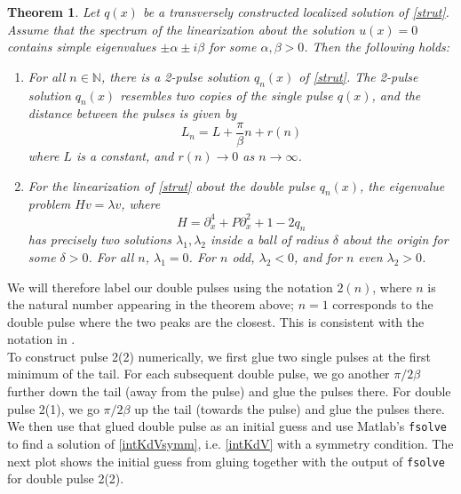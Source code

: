 \documentclass[12pt]{article}
\def\N{{\mathbb N}}
\newtheorem{theorem}{Theorem}
\begin{document}
\begin{theorem}
Let $q(x)$ be a transversely constructed localized solution of \eqref{strut}. Assume that the spectrum of the linearization about the solution $u(x) = 0$ contains simple eigenvalues $\pm \alpha \pm i \beta$ for some $\alpha, \beta > 0$. Then the following holds:
\begin{enumerate}

\item For all $n \in \N$, there is a 2-pulse solution $q_n(x)$ of \eqref{strut}. The 2-pulse solution $q_n(x)$ resembles two copies of the single pulse $q(x)$, and the distance between the pulses is given by
\begin{equation}\label{pulsedistance}
L_n = L + \frac{\pi}{\beta}n + r(n)
\end{equation}
where $L$ is a constant, and $r(n) \rightarrow 0$ as $n \rightarrow \infty$. 

\item For the linearization of \eqref{strut} about the double pulse $q_n(x)$, the eigenvalue problem $H v = \lambda v$, where
\begin{equation*}
H = \partial_x^4 + P \partial_x^2 + 1 - 2 q_n  
\end{equation*}
has precisely two solutions $\lambda_1, \lambda_2$ inside a ball of radius $\delta$ about the origin for some $\delta > 0$. For all $n$, $\lambda_1 = 0$. For $n$ odd, $\lambda_2 < 0$, and for $n$ even $\lambda_2 > 0$.

\end{enumerate}
\end{theorem}

We will therefore label our double pulses using the notation $2(n)$, where $n$ is the natural number appearing in the theorem above; $n = 1$ corresponds to the double pulse where the two peaks are the closest. This is consistent with the notation in \cite{Champneys1993}.\\

To construct pulse 2(2) numerically, we first glue two single pulses at the first minimum of the tail. For each subsequent double pulse, we go another $\pi / 2 \beta$ further down the tail (away from the pulse) and glue the pulses there. For double pulse 2(1), we go $\pi / 2 \beta$ up the tail (towards the pulse) and glue the pulses there. We then use that glued double pulse as an initial guess and use Matlab's \texttt{fsolve} to find a solution of \eqref{intKdVsymm}, i.e. \eqref{intKdV} with a symmetry condition. The next plot shows the initial guess from gluing together with the output of \texttt{fsolve} for double pulse 2(2).
\end{document}
